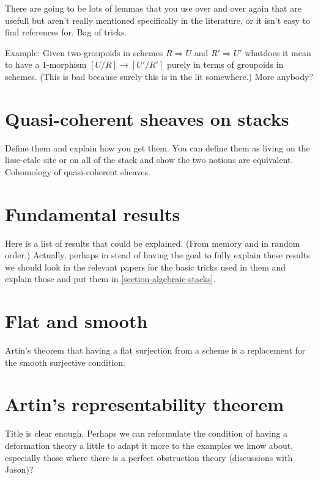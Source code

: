 \noindent
There are going to be lots of lemmas that you use over and over again
that are usefull but aren't really mentioned specifically in the literature,
or it isn't easy to find references for. Bag of tricks.

\medskip\noindent
Example: Given two groupoids in schemes $R\Rightarrow U$ and
$R' \Rightarrow U'$ whatdoes it mean to have a $1$-morphism
$[U/R] \to [U'/R']$ purely in terms of groupoids in schemes.
(This is bad because surely this is in the lit somewhere.)
More anybody?

\section{Quasi-coherent sheaves on stacks}
\label{section-quasi-coherent}

\noindent
Define them and explain how you get them. You can define them as living on the
lisse-etale site or on all of the stack and show the two notions are
equivalent. Cohomology of quasi-coherent sheaves.

\section{Fundamental results}
\label{section-results-fundamental}

\noindent
Here is a list of results that could be explained. (From memory and in
random order.) Actually, perhaps in stead of having the goal to fully explain
these results we should look in the relevant papers for the basic tricks
used in them and explain those and put them in
\ref{section-algebraic-stacks}.

\section{Flat and smooth}
\label{section-flat-smooth}

\noindent
Artin's theorem that having a flat surjection from a scheme is a replacement
for the smooth surjective condition.

\section{Artin's representability theorem}
\label{section-representability}

\noindent
Title is clear enough. Perhaps we can reformulate the condition of having a
deformation theory a little to adapt it more to the examples we know about,
especially those where there is a perfect obstruction theory (discussions
with Jason)?

